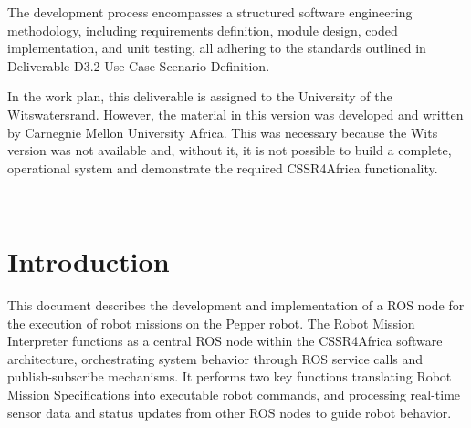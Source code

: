\documentclass{CSSRforAfrica}
\begin{document}
The development process encompasses a structured software engineering methodology, including requirements definition, module design, coded implementation, and unit testing, all adhering to the standards outlined in Deliverable D3.2 Use Case Scenario Definition.

In the work plan, this deliverable is assigned to the University of the Witswatersrand. However, the material in this version was developed and written by Carnegnie Mellon University Africa. This was necessary because the Wits version was not available and, without it, it is not possible to build a complete, operational system and demonstrate the required CSSR4Africa functionality. 
\newpage
 
 
\pagebreak
~\vspace{-19mm} %
\tableofcontents
\newpage



\section{Introduction}

This document describes the development and implementation of a ROS node for the execution of robot missions on the Pepper robot. The Robot Mission Interpreter functions as a central ROS node within the CSSR4Africa software architecture, orchestrating system behavior through ROS service calls and publish-subscribe mechanisms. It performs two key functions translating  Robot Mission Specifications into executable robot commands, and processing real-time sensor data and status updates from other ROS nodes to guide robot behavior.
\end{document}
